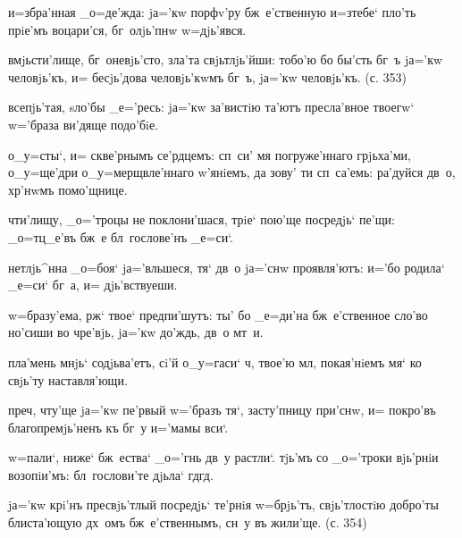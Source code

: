 и=збра'нная _о=де'жда: jа='кw порфv'ру бж~е'ственную 
и=з\ъ тебе` пло'ть прiе'мъ воцари'ся, бг~олjь'пнw 
w=дjь'явся.

вмjьсти'лище, бг~оневjь'сто, зла'та свjьтлjь'йши: тобо'ю 
бо бы'сть бг~ъ jа='кw человjь'къ, и= бесjь'дова 
человjь'кwмъ бг~ъ, jа='кw человjь'къ. (с. 353)

всепjь'тая, sло'бы _е='ресь: jа='кw за'вистiю та'ютъ 
пресла'вное твоегw` w='браза ви'дяще подо'бiе.



о_у=сты`, и= скве'рнымъ се'рдцемъ: сп~си' мя 
погруже'ннаго грjьха'ми, о_у=ще'дри о_у=мерщвле'ннаго 
w'янiемъ, да зову' ти сп~са'емь: ра'дуйся дв~о, 
хр'нwмъ помо'щнице.


чти'лищу, _о='троцы не поклони'шася, трiе` пою'ще 
посредjь` пе'щи: _о=тц_е'въ бж~е бл~гослове'нъ _е=си`.

нетлjь^нна _о=боя` jа='вльшеся, тя` дв~о jа='снw 
проявля'ютъ: и='бо родила` _е=си` бг~а, и= дjь'вствуеши.

w=бразу'ема, рж` твое` предпи'шутъ: ты' бо _е=ди'на 
бж~е'ственное сло'во но'сиши во чре'вjь, jа='кw до'ждь, 
дв~о мт~и.

пла'мень мнjь` содjьва'етъ, сi'й о_у=гаси` ч, твое'ю 
мл, покая'нiемъ мя` ко свjь'ту наставля'ющи.

преч, чту'ще jа='кw пе'рвый w='бразъ тя`, 
засту'пницу при'снw, и= покро'въ благопремjь'ненъ къ бг~у 
и='мамы вси`.


w=пали`, ниже` бж~ества` _о='гнь дв~у растли`. тjь'мъ со 
_о='троки вjь'рнiи возопiи'мъ: бл~гослови'те дjьла` 
гд гд.

jа='кw крi'нъ пресвjь'тлый посредjь` те'рнiя w=брjь'тъ, 
свjь'тлостiю добро'ты блиста'ющую дх~омъ бж~е'ственнымъ, 
сн~у въ жили'ще. (с. 354)

